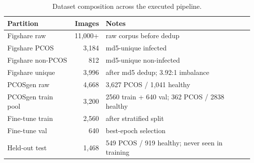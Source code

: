 \begin{table}[htbp]
  \centering
  \small
  \caption{Dataset composition across the executed pipeline.}
  \label{tab:dataset-composition}
  \begin{tabular}{lr@{\hspace{1em}}l}
    \toprule
    \textbf{Partition} & \textbf{Images} & \textbf{Notes} \\
    \midrule
    Figshare raw & 11,000+ & raw corpus before dedup \\
    Figshare PCOS & 3,184 & md5-unique infected \\
    Figshare non-PCOS & 812 & md5-unique non-infected \\
    Figshare unique & 3,996 & after md5 dedup; 3.92:1 imbalance \\
    PCOSgen raw & 4,668 & 3,627 PCOS / 1,041 healthy \\
    PCOSgen train pool & 3,200 & 2560 train + 640 val; 362 PCOS / 2838 healthy \\
    Fine-tune train & 2,560 & after stratified split \\
    Fine-tune val & 640 & best-epoch selection \\
    Held-out test & 1,468 & 549 PCOS / 919 healthy; never seen in training \\
    \bottomrule
  \end{tabular}
\end{table}
